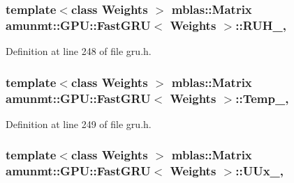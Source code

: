\subsubsection[{\texorpdfstring{R\+U\+H\+\_\+}{RUH_}}]{\setlength{\rightskip}{0pt plus 5cm}template$<$class Weights $>$ {\bf mblas\+::\+Matrix} {\bf amunmt\+::\+G\+P\+U\+::\+Fast\+G\+RU}$<$ {\bf Weights} $>$\+::R\+U\+H\+\_\+\hspace{0.3cm}{\ttfamily [mutable]}, {\ttfamily [private]}}\hypertarget{classamunmt_1_1GPU_1_1FastGRU_a859346068a908bdf3226a12c759c45e8}{}\label{classamunmt_1_1GPU_1_1FastGRU_a859346068a908bdf3226a12c759c45e8}


Definition at line 248 of file gru.\+h.

\subsubsection[{\texorpdfstring{Temp\+\_\+}{Temp_}}]{\setlength{\rightskip}{0pt plus 5cm}template$<$class Weights $>$ {\bf mblas\+::\+Matrix} {\bf amunmt\+::\+G\+P\+U\+::\+Fast\+G\+RU}$<$ {\bf Weights} $>$\+::Temp\+\_\+\hspace{0.3cm}{\ttfamily [mutable]}, {\ttfamily [private]}}\hypertarget{classamunmt_1_1GPU_1_1FastGRU_adb34d91baba03402316d2475efefb1ec}{}\label{classamunmt_1_1GPU_1_1FastGRU_adb34d91baba03402316d2475efefb1ec}


Definition at line 249 of file gru.\+h.

\subsubsection[{\texorpdfstring{U\+Ux\+\_\+}{UUx_}}]{\setlength{\rightskip}{0pt plus 5cm}template$<$class Weights $>$ {\bf mblas\+::\+Matrix} {\bf amunmt\+::\+G\+P\+U\+::\+Fast\+G\+RU}$<$ {\bf Weights} $>$\+::U\+Ux\+\_\+\hspace{0.3cm}{\ttfamily [mutable]}, {\ttfamily [private]}}\hypertarget{classamunmt_1_1GPU_1_1FastGRU_a59f623c97d07e31cf4714655acb724d7}{}\label{classamunmt_1_1GPU_1_1FastGRU_a59f623c97d07e31cf4714655acb724d7}


